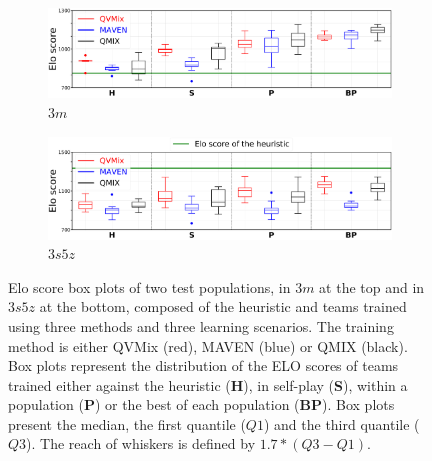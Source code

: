 \begin{figure}[ht]
\begin{subfigure}{\textwidth}
\centering
\includegraphics[width=.95\textwidth]{tex_thesis/figures/ch7/3m_tiny_all_h_clean.pdf}
\caption{$3m$}
\label{subfig:3m_all_h}
\end{subfigure}
\begin{subfigure}{\textwidth}
\centering
\includegraphics[width=.95\textwidth]{tex_thesis/figures/ch7/3s5z_tiny_all_h_clean.pdf}
\caption{$3s5z$}
\label{subfig:3s5z_all_h}
\end{subfigure}
\caption{
Elo score box plots of two test populations, in $3m$ at the top and in $3s5z$ at the bottom, composed of the heuristic and teams trained using three methods and three learning scenarios.
The training method is either QVMix (red), MAVEN (blue) or QMIX (black).
Box plots represent the distribution of the ELO scores of teams trained either against the heuristic (\textbf{H}), in self-play (\textbf{S}), within a population (\textbf{P}) or the best of each population (\textbf{BP}).
Box plots present the median, the first quantile ($Q1$) and the third quantile ($Q3$). The reach of whiskers is defined by $1.7*(Q3-Q1)$.
}
\label{fig:all}
\end{figure}

